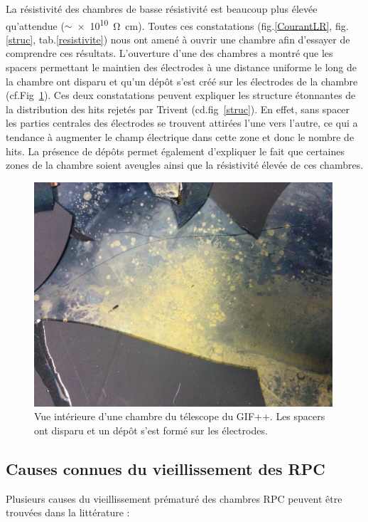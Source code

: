 La résistivité des chambres de basse résistivité est beaucoup plus élevée qu'attendue ($\sim$\SI{e10}{\ohm.\centi\meter}). Toutes ces constatations (fig.\ref{CourantLR}, fig.\ref{struc}, tab.\ref{resistivite}) nous ont amené à ouvrir une chambre afin d'essayer de comprendre ces résultats.
\vspace{0.4cm}
\newpage
L'ouverture d'une des chambres a montré que les spacers permettant le maintien des électrodes à une distance uniforme le long de la chambre ont disparu et qu'un dépôt s'est créé sur les électrodes de la chambre (cf.Fig~\ref{depot}). Ces deux constatations peuvent expliquer les structure étonnantes de la distribution des hits rejetés par Trivent (cd.fig~\ref{struc}). En effet, sans spacer les parties centrales des électrodes se trouvent attirées l'une vers l'autre, ce qui a tendance à augmenter le champ électrique dans cette zone et donc le nombre de hits. La présence de dépôts permet également d'expliquer le fait que certaines zones de la chambre soient aveugles ainsi que la résistivité élevée de ces chambres.

\begin{figure}[!ht]
	\centering
	\includegraphics[width=0.99\textwidth]{GLA/depot.jpg}
	\caption{Vue intérieure d'une chambre du télescope du GIF++. Les spacers ont disparu et un dépôt s'est formé sur les électrodes.}
	\label{depot}
\end{figure}

\subsection{Causes connues du vieillissement des RPC }
Plusieurs causes du vieillissement prématuré des chambres RPC peuvent être trouvées dans la littérature :

